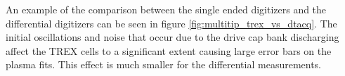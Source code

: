 An example of the comparison between the single ended digitizers and the differential digitizers can be seen in figure \ref{fig:multitip_trex_vs_dtacq}. The initial oscillations and noise that occur due to the drive cap bank discharging affect the TREX cells to a significant extent causing large error bars on the plasma fits. This effect is much smaller for the differential measurements.




